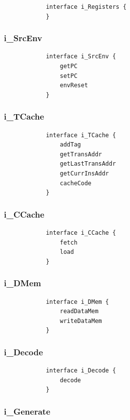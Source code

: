 \documentclass{report}
\begin{document}
			\begin{lstlisting}
			interface i_Registers {
			}
			\end{lstlisting}
			
			\subsubsection*{i\_SrcEnv}	
			
			\begin{lstlisting}
			interface i_SrcEnv {
				getPC
				setPC
				envReset
			}
			\end{lstlisting}
			
			\subsubsection*{i\_TCache}
		
			\begin{lstlisting}
			interface i_TCache {
				addTag 			
				getTransAddr		
				getLastTransAddr 	
				getCurrInsAddr	
				cacheCode		
			}
			\end{lstlisting}
			
			\subsubsection*{i\_CCache}
			
			\begin{lstlisting}
			interface i_CCache {
				fetch	
				load
			}
			\end{lstlisting}
			
			\subsubsection*{i\_DMem}
			
			\begin{lstlisting}
			interface i_DMem {
				readDataMem	 	
				writeDataMem
			}
			\end{lstlisting}			
			
			\subsubsection*{i\_Decode}
			
			\begin{lstlisting}
			interface i_Decode {
				decode 
			}
			\end{lstlisting}	
			
			\subsubsection*{i\_Generate}
			
\end{document}
